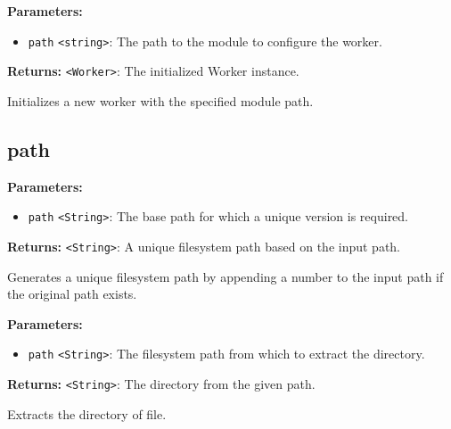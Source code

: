 \documentclass[12pt,a4paper]{article}
\begin{document}
\vspace{5mm}
\noindent {}


\noindent \textbf{Parameters:}
\begin{itemize}
  \item \texttt{path} \texttt{<string>}: The path to the module to configure the worker.
\end{itemize}

\noindent \textbf{Returns:} \texttt{<Worker>}: The initialized Worker instance.

\noindent Initializes a new worker with the specified module path.


\subsection{path}
\vspace{5mm}
\noindent {}


\noindent \textbf{Parameters:}
\begin{itemize}
  \item \texttt{path} \texttt{<String>}: The base path for which a unique version is required.
\end{itemize}

\noindent \textbf{Returns:} \texttt{<String>}: A unique filesystem path based on the input path.

\noindent Generates a unique filesystem path by appending a number to the input path if the original path exists.

\vspace{5mm}
\noindent {}


\noindent \textbf{Parameters:}
\begin{itemize}
  \item \texttt{path} \texttt{<String>}: The filesystem path from which to extract the directory.
\end{itemize}

\noindent \textbf{Returns:} \texttt{<String>}: The directory from the given path.

\noindent Extracts the directory of file.
\end{document}

